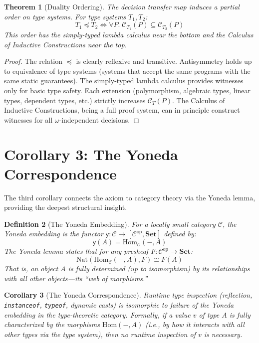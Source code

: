 \documentclass[11pt]{article}
\newtheorem{theorem}{Theorem}[section]
\newtheorem{corollary}[theorem]{Corollary}
\newtheorem{definition}[theorem]{Definition}
\newcommand{\Set}{\mathbf{Set}}
\newcommand{\Cop}{\mathcal{C}^{\mathrm{op}}}
\newcommand{\Nat}{\mathrm{Nat}}
\begin{document}
\begin{theorem}[Duality Ordering]
\label{thm:ordering}
The decision transfer map induces a partial order on type systems. For type systems
$T_1, T_2$:
\[
  T_1 \preceq T_2 \iff \forall P.\; \mathcal{C}_{T_1}(P) \subseteq \mathcal{C}_{T_2}(P)
\]
This order has the simply-typed lambda calculus near the bottom and the Calculus of
Inductive Constructions near the top.
\end{theorem}

\begin{proof}
The relation $\preceq$ is clearly reflexive and transitive. Antisymmetry holds up to
equivalence of type systems (systems that accept the same programs with the same
static guarantees). The simply-typed lambda calculus provides witnesses only for basic
type safety. Each extension (polymorphism, algebraic types, linear types, dependent
types, etc.) strictly increases $\mathcal{C}_T(P)$. The Calculus of Inductive
Constructions, being a full proof system, can in principle construct witnesses for all
$\omega$-independent decisions.
\end{proof}


\section{Corollary 3: The Yoneda Correspondence}
\label{sec:corollary3}

The third corollary connects the axiom to category theory via the Yoneda lemma,
providing the deepest structural insight.

\begin{definition}[The Yoneda Embedding]
\label{def:yoneda}
For a locally small category $\mathcal{C}$, the \emph{Yoneda embedding} is the functor
$\mathsf{y} : \mathcal{C} \to [\Cop, \Set]$ defined by:
\[
  \mathsf{y}(A) = \mathrm{Hom}_{\mathcal{C}}(-, A)
\]
The Yoneda lemma states that for any presheaf $F : \Cop \to \Set$:
\[
  \Nat(\mathrm{Hom}_{\mathcal{C}}(-, A), F) \cong F(A)
\]
That is, an object $A$ is fully determined (up to isomorphism) by its relationships
with all other objects---its ``web of morphisms.''
\end{definition}

\begin{corollary}[The Yoneda Correspondence]
\label{cor:yoneda}
Runtime type inspection (reflection, \texttt{instanceof}, \texttt{typeof}, dynamic
casts) is isomorphic to failure of the Yoneda embedding in the type-theoretic category.
Formally, if a value $v$ of type $A$ is fully characterized by the morphisms
$\mathrm{Hom}(-, A)$ (i.e., by how it interacts with all other types via the type system),
then no runtime inspection of $v$ is necessary.
\end{corollary}
\end{document}
